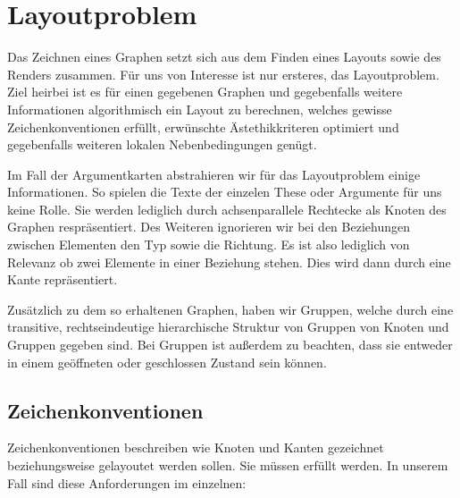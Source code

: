 \section{Layoutproblem}
Das Zeichnen eines Graphen setzt sich aus dem Finden eines Layouts sowie des Renders zusammen. 
Für uns von Interesse ist nur ersteres, das Layoutproblem. 
Ziel heirbei ist es für einen gegebenen Graphen und gegebenfalls weitere Informationen algorithmisch ein Layout zu berechnen,
welches gewisse Zeichenkonventionen erfüllt, erwünschte Ästethikkriteren optimiert und gegebenfalls weiteren lokalen Nebenbedingungen genügt.

Im Fall der Argumentkarten abstrahieren wir für das Layoutproblem einige Informationen. 
So spielen die Texte der einzelen These oder Argumente für uns keine Rolle. 
Sie werden lediglich durch achsenparallele Rechtecke als Knoten des Graphen respräsentiert.
Des Weiteren ignorieren wir bei den Beziehungen zwischen Elementen den Typ sowie die Richtung. 
Es ist also lediglich von Relevanz ob zwei Elemente in einer Beziehung stehen.
Dies wird dann durch eine Kante repräsentiert. 

Zusätzlich zu dem so erhaltenen Graphen, haben wir Gruppen, 
welche durch eine transitive, rechtseindeutige hierarchische Struktur von Gruppen von Knoten und Gruppen gegeben sind.
Bei Gruppen ist außerdem zu beachten, dass sie entweder in einem geöffneten oder geschlossen Zustand sein können.


\subsection{Zeichenkonventionen}
Zeichenkonventionen beschreiben wie Knoten und Kanten gezeichnet beziehungsweise gelayoutet werden sollen. Sie müssen erfüllt werden.
In unserem Fall sind diese Anforderungen im einzelnen:

